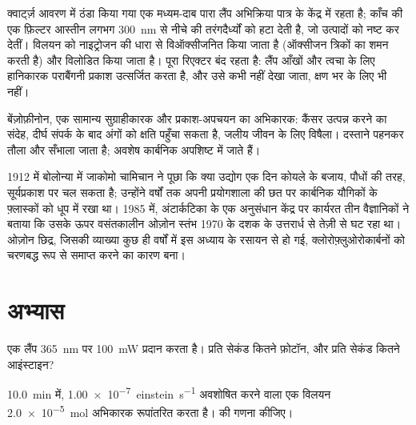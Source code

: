 \begin{inthelab}[एक प्रकाश-रिएक्टर]
क्वार्ट्ज़ आवरण में ठंडा किया गया एक मध्यम-दाब पारा लैंप अभिक्रिया पात्र के केंद्र में
रहता है; काँच की एक फ़िल्टर आस्तीन लगभग \qty{300}{nm} से नीचे की तरंगदैर्ध्यों को हटा देती है,
जो उत्पादों को नष्ट कर देतीं। विलयन को नाइट्रोजन की धारा से
विऑक्सीजनित किया जाता है (ऑक्सीजन त्रिकों का शमन करती है) और विलोडित किया जाता है।
पूरा रिएक्टर बंद रहता है: लैंप आँखों और त्वचा के लिए हानिकारक पराबैंगनी प्रकाश
उत्सर्जित करता है, और उसे कभी नहीं देखा जाता, क्षण भर के लिए भी नहीं।
\end{inthelab}

\begin{safety}{}
बेंज़ोफ़ीनोन, एक सामान्य सुग्राहीकारक और प्रकाश-अपचयन का अभिकारक:
कैंसर उत्पन्न करने का संदेह, दीर्घ संपर्क के बाद अंगों को क्षति पहुँचा सकता है,
जलीय जीवन के लिए विषैला। दस्ताने पहनकर तौला और सँभाला जाता है; अवशेष
कार्बनिक अपशिष्ट में जाते हैं।
\end{safety}

\begin{history}[भविष्य का प्रकाशरसायन, और आकाश का छिद्र]
1912 में बोलोन्या में जाकोमो चामिचान ने पूछा कि क्या उद्योग एक दिन कोयले के बजाय,
पौधों की तरह, सूर्यप्रकाश पर चल सकता है; उन्होंने वर्षों तक अपनी प्रयोगशाला की छत पर
कार्बनिक यौगिकों के फ़्लास्कों को धूप में रखा था। 1985 में,
अंटार्कटिका के एक अनुसंधान केंद्र पर कार्यरत तीन वैज्ञानिकों ने बताया कि उसके ऊपर
वसंतकालीन ओज़ोन स्तंभ 1970 के दशक के उत्तरार्ध से तेज़ी से
घट रहा था।
ओज़ोन छिद्र, जिसकी व्याख्या कुछ ही वर्षों में इस अध्याय के रसायन से हो गई,
क्लोरोफ़्लुओरोकार्बनों को चरणबद्ध रूप से समाप्त करने का कारण बना।
\end{history}

\section{अभ्यास}

\begin{exercise}[$\star$]\label{exo:b3:photochemistry:1}
एक लैंप \qty{365}{nm} पर \qty{100}{mW} प्रदान करता है। प्रति सेकंड कितने फ़ोटॉन, और
प्रति सेकंड कितने आइंस्टाइन?
\end{exercise}

\begin{exercise}[$\star$]\label{exo:b3:photochemistry:2}
\qty{10.0}{min} में, \qty{1.00e-7}{einstein.s^{-1}} अवशोषित करने वाला एक विलयन
\qty{2.0e-5}{mol} अभिकारक रूपांतरित करता है।  की गणना कीजिए।
\end{exercise}

